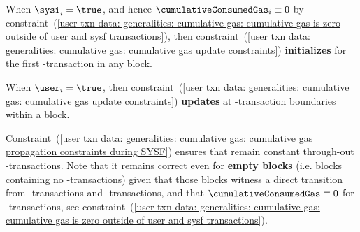 \saNote{}
When $\sysi _{i} = \true$, and hence $\cumulativeConsumedGas _{i} \equiv 0$
by constraint~(\ref{user txn data: generalities: cumulative gas: cumulative gas is zero outside of user and sysf transactions}),
then
constraint~(\ref{user txn data: generalities: cumulative gas: cumulative gas update constraints})
\textbf{initializes} \cumulativeConsumedGas{} for the first \user{}-transaction in any block.

\saNote{}
When $\user _{i} = \true$,
then
constraint~(\ref{user txn data: generalities: cumulative gas: cumulative gas update constraints})
\textbf{updates} \cumulativeConsumedGas{} at \user{}-transaction boundaries within a block.

\saNote{}
Constraint~(\ref{user txn data: generalities: cumulative gas: cumulative gas propagation constraints during SYSF})
ensures that \cumulativeConsumedGas{} remain constant through-out
\sysf{}-transactions.
Note that it remains correct even for \textbf{empty blocks}
(i.e. blocks containing no \user{}-transactions) given that those blocks witness
a direct transition from \sysi{}-transactions and \sysf{}-transactions,
and that $\cumulativeConsumedGas \equiv 0$ for \sysi{}-transactions,
see constraint~(\ref{user txn data: generalities: cumulative gas: cumulative gas is zero outside of user and sysf transactions}).
